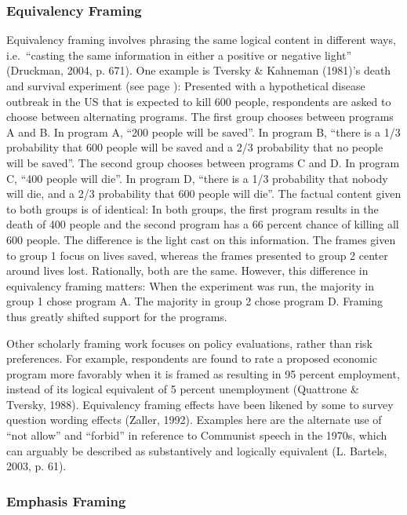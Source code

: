 \documentclass[12pt,econ]{sources/authesis}
\begin{document}
\hypertarget{framing-theory-framing-equiv}{%
\subsubsection{Equivalency Framing}\label{framing-theory-framing-equiv}}

Equivalency framing involves phrasing the same logical content in different ways, i.e.~``casting the same information in either a positive or negative light'' (Druckman, 2004, p. 671). One example is Tversky \& Kahneman (1981)'s death and survival experiment (see page \pageref{death}): Presented with a hypothetical disease outbreak in the US that is expected to kill 600 people, respondents are asked to choose between alternating programs. The first group chooses between programs A and B. In program A, ``200 people will be saved''. In program B, ``there is a 1/3 probability that 600 people will be saved and a 2/3 probability that no people will be saved''. The second group chooses between programs C and D. In program C, ``400 people will die''. In program D, ``there is a 1/3 probability that nobody will die, and a 2/3 probability that 600 people will die''. The factual content given to both groups is of identical: In both groups, the first program results in the death of 400 people and the second program has a 66 percent chance of killing all 600 people. The difference is the light cast on this information. The frames given to group 1 focus on lives saved, whereas the frames presented to group 2 center around lives lost. Rationally, both are the same. However, this difference in equivalency framing matters: When the experiment was run, the majority in group 1 chose program A. The majority in group 2 chose program D. Framing thus greatly shifted support for the programs.

Other scholarly framing work focuses on policy evaluations, rather than risk preferences. For example, respondents are found to rate a proposed economic program more favorably when it is framed as resulting in 95 percent employment, instead of its logical equivalent of 5 percent unemployment (Quattrone \& Tversky, 1988). Equivalency framing effects have been likened by some to survey question wording effects (Zaller, 1992). Examples here are the alternate use of ``not allow'' and ``forbid'' in reference to Communist speech in the 1970s, which can arguably be described as substantively and logically equivalent (L. Bartels, 2003, p. 61).

\hypertarget{framing-theory-framing-emph}{%
\subsubsection{Emphasis Framing}\label{framing-theory-framing-emph}}
\end{document}
